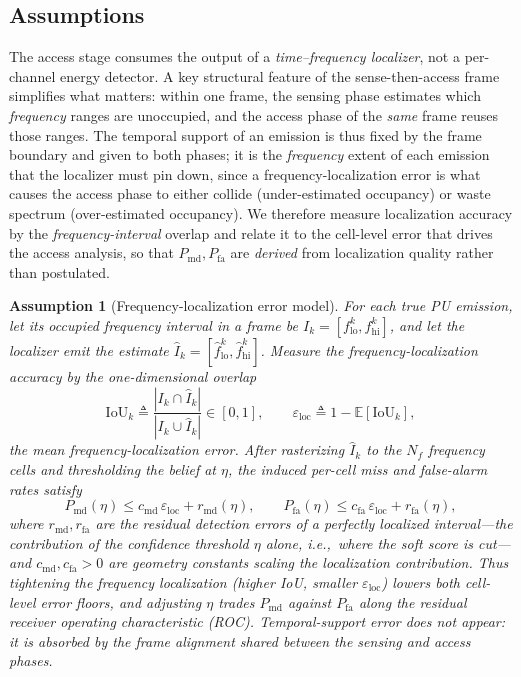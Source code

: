 \documentclass[journal]{IEEEtran}
\newtheorem{assumption}{Assumption}
\newcommand{\E}{\mathbb{E}}
\newcommand{\defeq}{\triangleq}
\newcommand{\Nf}{N_f}                      %
\newcommand{\Pmd}{P_{\mathrm{md}}}         %
\newcommand{\Pfa}{P_{\mathrm{fa}}}         %
\newcommand{\thr}{\eta}                    %
\newcommand{\iou}{\mathrm{IoU}}
\newcommand{\eloc}{\varepsilon_{\mathrm{loc}}}
\newcommand{\cmd}{c_{\mathrm{md}}}
\newcommand{\cfa}{c_{\mathrm{fa}}}
\newcommand{\rmd}{r_{\mathrm{md}}}
\newcommand{\rfa}{r_{\mathrm{fa}}}
\newcommand{\fint}{I}
\newcommand{\flo}{f_{\mathrm{lo}}}
\newcommand{\fhi}{f_{\mathrm{hi}}}
\begin{document}
\subsection{Assumptions}
\label{subsec:assumptions}

The access stage consumes the output of a \emph{time--frequency localizer},
not a per-channel energy detector. A key structural feature of the
sense-then-access frame simplifies what matters: within one frame, the
sensing phase estimates which \emph{frequency} ranges are unoccupied, and the
access phase of the \emph{same} frame reuses those ranges. The temporal
support of an emission is thus fixed by the frame boundary and given to both
phases; it is the \emph{frequency} extent of each emission that the localizer
must pin down, since a frequency-localization error is what causes the access
phase to either collide (under-estimated occupancy) or waste spectrum
(over-estimated occupancy). We therefore measure localization accuracy by the
\emph{frequency-interval} overlap and relate it to the cell-level error that
drives the access analysis, so that $\Pmd,\Pfa$ are \emph{derived} from
localization quality rather than postulated.

\begin{assumption}[Frequency-localization error model]
\label{as:localization}
For each true PU emission, let its occupied frequency interval in a frame be
$\fint_k=[\flo^{k},\fhi^{k}]$, and let the localizer emit the estimate
$\hat\fint_k=[\hat\flo^{k},\hat\fhi^{k}]$. Measure the frequency-localization
accuracy by the one-dimensional overlap
\begin{equation}
\iou_k\defeq\frac{|\fint_k\cap\hat\fint_k|}{|\fint_k\cup\hat\fint_k|}\in[0,1],
\qquad
\eloc\defeq 1-\E[\iou_k],
\label{eq:freq_iou}
\end{equation}
the mean frequency-localization error. After rasterizing $\hat\fint_k$ to the
$\Nf$ frequency cells and thresholding the belief at $\thr$, the induced
per-cell miss and false-alarm rates satisfy
\begin{equation}
\Pmd(\thr)\le \cmd\,\eloc + \rmd(\thr),
\qquad
\Pfa(\thr)\le \cfa\,\eloc + \rfa(\thr),
\label{eq:loc_to_cell}
\end{equation}
where $\rmd,\rfa$ are the residual detection errors of a perfectly localized
interval---the contribution of the \emph{confidence threshold} $\thr$ alone,
i.e.,\ where the soft score is cut---and $\cmd,\cfa>0$ are geometry
constants scaling the \emph{localization} contribution. Thus tightening the
frequency localization (higher IoU, smaller $\eloc$) lowers both cell-level
error floors, and adjusting $\thr$ trades $\Pmd$ against $\Pfa$ along the
residual receiver operating characteristic (ROC). Temporal-support error does
not appear: it is absorbed by the
frame alignment shared between the sensing and access phases.
\end{assumption}
\end{document}
